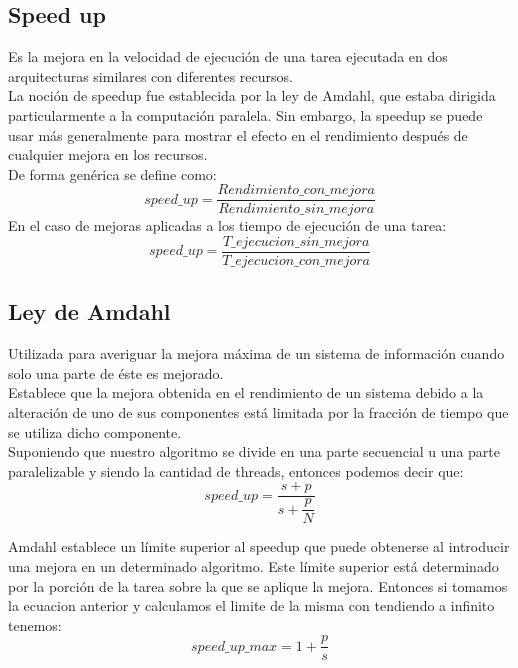 \subsection{Speed up}

Es la mejora en la velocidad de ejecución de una tarea ejecutada en dos
arquitecturas similares con diferentes recursos.\\
La noción de speedup fue establecida por la ley de Amdahl, que estaba
dirigida particularmente a la computación paralela. Sin embargo, la speedup se
puede usar más generalmente para mostrar el efecto en el rendimiento después de
cualquier mejora en los recursos.\\
De forma genérica se define como:
\begin{equation}
    speed\_up = \dfrac{Rendimiento\_con\_mejora}{Rendimiento\_sin\_mejora}
\end{equation}
En el caso de mejoras aplicadas a los tiempo de ejecución de una tarea:
\begin{equation}
    speed\_up = \dfrac{T\_ejecucion\_sin\_mejora}{T\_ejecucion\_con\_mejora}
\end{equation}

\subsection{Ley de Amdahl}

Utilizada para averiguar la mejora máxima de un sistema de información cuando
solo una parte de éste es mejorado.\\
Establece que la mejora obtenida en el rendimiento de un sistema debido a la
alteración de uno de sus componentes está limitada por la fracción de tiempo
que se utiliza dicho componente.\\

Suponiendo que nuestro algoritmo se divide en una parte secuencial 
u una parte paralelizable  y siendo  la cantidad de threads,
entonces podemos decir que:
\begin{equation}
    speed\_up = \dfrac{s+p}{s+\dfrac{p}{N}}
\end{equation}

Amdahl establece un límite superior al speedup que puede obtenerse al
introducir una mejora en un determinado algoritmo. Este límite superior está
determinado por la porción de la tarea sobre la que se aplique la mejora.
Entonces si tomamos la ecuacion anterior y calculamos el limite de la misma con
 tendiendo a infinito tenemos:
\begin{equation}
    speed\_up\_max = 1 + \dfrac{p}{s}
\end{equation}
\newpage

